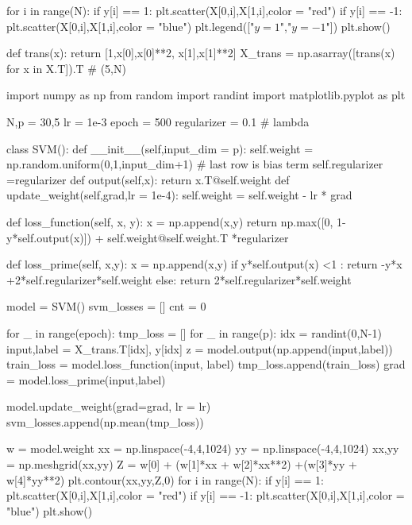 \documentclass[10pt]{article}
\begin{document}
\begin{python}
for i in range(N):
    if y[i] == 1:
        plt.scatter(X[0,i],X[1,i],color = "red")
    if y[i] == -1:
        plt.scatter(X[0,i],X[1,i],color = "blue")
plt.legend(["$y = 1$","$y = -1$"])
plt.show()

def trans(x):
    return [1,x[0],x[0]**2, x[1],x[1]**2]
X_trans = np.asarray([trans(x) for x in X.T]).T # (5,N)

import numpy as np
from random import randint
import matplotlib.pyplot as plt

N,p = 30,5
lr = 1e-3
epoch = 500
regularizer = 0.1 # lambda

class SVM():
    def __init__(self,input_dim = p):
        self.weight = np.random.uniform(0,1,input_dim+1) # last row is bias term
        self.regularizer =regularizer
    def output(self,x):
        return x.T@self.weight
    def update_weight(self,grad,lr = 1e-4):
        self.weight = self.weight - lr * grad

    def loss_function(self, x, y):
        x = np.append(x,y)
        return np.max([0, 1-y*self.output(x)]) + self.weight@self.weight.T *regularizer
    
    def loss_prime(self, x,y):
        x = np.append(x,y)
        if y*self.output(x) <1 : 
            return -y*x +2*self.regularizer*self.weight
        else:
            return 2*self.regularizer*self.weight

model = SVM()
svm_losses = []
cnt = 0

for _ in range(epoch):
    tmp_loss = []
    for _ in range(p):
        idx = randint(0,N-1)
        input,label = X_trans.T[idx], y[idx]
        z = model.output(np.append(input,label))
        train_loss = model.loss_function(input, label)
        tmp_loss.append(train_loss)
        grad = model.loss_prime(input,label)
        
        model.update_weight(grad=grad, lr = lr)
    svm_losses.append(np.mean(tmp_loss))

w = model.weight
xx = np.linspace(-4,4,1024)
yy = np.linspace(-4,4,1024)
xx,yy = np.meshgrid(xx,yy)
Z = w[0] + (w[1]*xx + w[2]*xx**2) +(w[3]*yy + w[4]*yy**2)
plt.contour(xx,yy,Z,0)
for i in range(N):
    if y[i] == 1:
        plt.scatter(X[0,i],X[1,i],color = "red")
    if y[i] == -1:
        plt.scatter(X[0,i],X[1,i],color = "blue")
plt.show()



\end{python}
\end{document}
